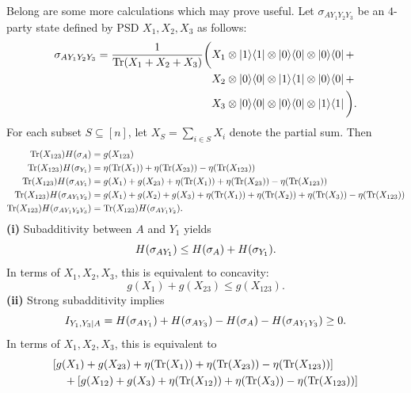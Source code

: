\documentclass[notitlepage, 10pt]{article}
\begin{document}
{Belong are some more calculations which may prove useful.
Let $\sigma_{AY_1Y_2Y_3}$ be an $4$-party state defined by PSD $X_1,X_2,X_3$ as follows:
\begin{align}
    \begin{split}
        \sigma_{AY_1Y_2Y_3} = \frac{1}{\Tr(X_1+X_2+X_3)}\bigg(
            &X_1 \ot \ket1\!\bra1 \ot \ket0\!\bra0 \ot \ket0\!\bra0 +\\
            &X_2 \ot \ket0\!\bra0 \ot \ket1\!\bra1 \ot \ket0\!\bra0 +\\
            &X_3 \ot \ket0\!\bra0 \ot \ket0\!\bra0 \ot \ket1\!\bra1
        \bigg).
    \end{split}
\end{align}
For each subset $S \subseteq [n]$, let $X_S = \sum_{i\in S}X_i$ denote the partial sum.
Then
\begin{align}
    \operatorname{Tr}(X_{123})H(\sigma_{A}) &= g(X_{123}) \\
    \operatorname{Tr}(X_{123})H(\sigma_{Y_1}) &= \eta(\operatorname{Tr}(X_1)) + \eta(\operatorname{Tr}(X_{23})) - \eta(\operatorname{Tr}(X_{123}))\\
    \operatorname{Tr}(X_{123})H(\sigma_{AY_1}) &= g(X_{1}) + g(X_{23}) + \eta(\operatorname{Tr}(X_1)) + \eta(\operatorname{Tr}(X_{23})) - \eta(\operatorname{Tr}(X_{123})) \\
    \operatorname{Tr}(X_{123})H(\sigma_{AY_1Y_2}) &= g(X_{1})+ g(X_{2})+ g(X_{3})+\eta(\operatorname{Tr}(X_1)) + \eta(\operatorname{Tr}(X_2)) + \eta(\operatorname{Tr}(X_3)) - \eta(\operatorname{Tr}(X_{123}))\\
    \operatorname{Tr}(X_{123})H(\sigma_{AY_1Y_2Y_3}) &= \operatorname{Tr}(X_{123})H(\sigma_{AY_1Y_2}).
\end{align}
\textbf{(i)} 
Subadditivity between $A$ and $Y_1$ yields
\begin{equation}
    H(\sigma_{AY_1}) \leq H(\sigma_{A}) + H(\sigma_{Y_1}).
\end{equation}
In terms of $X_1,X_2,X_3$, this is equivalent to concavity:
\begin{equation}
    g(X_1) + g(X_{23}) \leq g(X_{123}).
\end{equation}
\textbf{(ii)} 
Strong subadditivity implies
\begin{equation}
    I_{Y_1,Y_3|A} = H(\sigma_{AY_1}) + H(\sigma_{AY_3}) - H(\sigma_{A}) - H(\sigma_{AY_1Y_3}) \geq 0.
\end{equation}
In terms of $X_1,X_2,X_3$, this is equivalent to
\begin{align}
    \begin{split}
        &[g(X_{1}) + g(X_{23}) + \eta(\Tr(X_1)) + \eta(\Tr(X_{23})) - \eta(\Tr(X_{123}))] \\
        &\quad+[g(X_{12}) + g(X_{3}) + \eta(\Tr(X_{12})) + \eta(\Tr(X_{3})) - \eta(\Tr(X_{123}))]\\

\end{split}
\end{align}}
\end{document}
